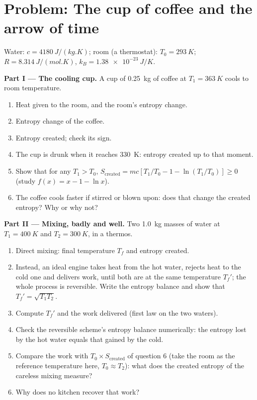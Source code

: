 \section{Problem: The cup of coffee and the arrow of time}

\begin{problem}
\label{pb:b1:second-law-entropy:1}
Water: $c = \qty{4180}{J/(kg.K)}$; room (a thermostat): $T_0 = \qty{293}{K}$;
$R = \qty{8.314}{J/(mol.K)}$, $k_B = \qty{1.38e-23}{J/K}$.

\medskip
\noindent\textbf{Part I --- The cooling cup.}
A cup of \qty{0.25}{kg} of coffee at $T_1 = \qty{363}{K}$ cools to room
temperature.
\begin{enumerate}
  \item Heat given to the room, and the room's entropy change.
  \item Entropy change of the coffee.
  \item Entropy created; check its sign.
  \item The cup is drunk when it reaches \qty{330}{K}: entropy created up
        to that moment.
  \item Show that for any $T_1 > T_0$, $S_{\mathrm{created}} = mc[T_1/T_0 - 1 -
        \ln(T_1/T_0)] \geq 0$ (study $f(x) = x - 1 - \ln x$).
  \item The coffee cools faster if stirred or blown upon: does that change
        the created entropy? Why or why not?
\end{enumerate}

\medskip
\noindent\textbf{Part II --- Mixing, badly and well.}
Two \qty{1.0}{kg} masses of water at $T_1 = \qty{400}{K}$ and $T_2 =
\qty{300}{K}$, in a thermos.
\begin{enumerate}[resume]
  \item Direct mixing: final temperature $T_f$ and entropy created.
  \item Instead, an ideal engine takes heat from the hot water, rejects
        heat to the cold one and delivers work, until both are at the same
        temperature $T_f'$; the whole process is reversible. Write the
        entropy balance and show that $T_f' = \sqrt{T_1T_2}$.
  \item Compute $T_f'$ and the work delivered (first law on the two
        waters).
  \item Check the reversible scheme's entropy balance numerically: the
        entropy lost by the hot water equals that gained by the cold.
  \item Compare the work with $T_0 \times S_{\mathrm{created}}$ of question 6
        (take the room as the reference temperature here, $T_0 \approx T_2$):
        what does the created entropy of the careless mixing measure?
  \item Why does no kitchen recover that work?
\end{enumerate}


\end{problem}

